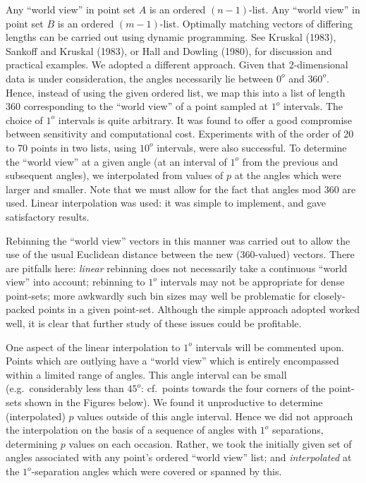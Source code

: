 Any ``world view'' in point set $A$ is an ordered $(n-1)$-list.  Any ``world
view'' in point set $B$ is an ordered $(m-1)$-list.  Optimally matching
vectors of differing lengths can be carried out using dynamic programming.
See Kruskal (1983), Sankoff and Kruskal (1983), or Hall
and Dowling (1980), for discussion and practical examples.  We adopted a
different approach.  Given that 2-dimensional data is under consideration,
the angles necessarily lie between $0^o$ and $360^o$.  Hence, instead of 
using the given ordered list, we map this into a list of length 360
corresponding to the ``world view'' of a point sampled at $1^o$ intervals.
The choice of $1^o$ intervals is quite arbitrary.  It was found 
to offer a good compromise between 
sensitivity and computational cost.  Experiments with of the order of 20 to 70
points in two lists, using $10^o$ intervals, were also successful.
To determine the ``world view'' at 
a given angle (at an interval of $1^o$ from the previous and subsequent
angles), we interpolated from values of $p$ at the angles which were larger
and smaller.  Note that we must allow for the fact that angles mod $360$ are
used.  Linear interpolation was used: it was simple to 
implement, and gave satisfactory results.   
 
Rebinning the ``world view'' vectors in this manner was carried out to 
allow the use of the usual Euclidean distance between the new (360-valued)
vectors.  There are pitfalls here: {\it linear} rebinning does not necessarily
take a continuous ``world view'' into account; rebinning to $1^o$ intervals
may not be appropriate for dense point-sets; more awkwardly such bin sizes
may well be problematic for closely-packed points in a given point-set.
Although the simple approach adopted worked well, it is clear that further
study of these issues could be profitable.

One aspect of the linear interpolation to $1^o$ intervals will be commented 
upon.  Points which are
outlying have a ``world view'' which is entirely encompassed within a 
limited range of angles.  This angle interval can be small (e.g.\ considerably
less than $45^o$: cf.\ points towards the four corners of the
point-sets shown in the Figures below).  We found it 
unproductive to determine (interpolated)
$p$ values outside of this angle interval.  Hence we did not approach the
interpolation on the basis of a sequence of angles with $1^o$ separations,
determining $p$ values on each occasion.  Rather, we took the initially
given set of angles associated with any point's ordered ``world view''
list; and {\it interpolated} at the $1^o$-separation angles which were
covered or spanned by this.  

